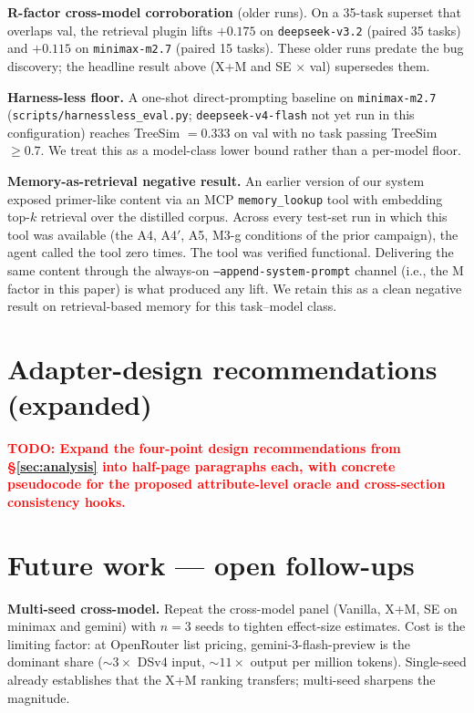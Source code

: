 \documentclass{article}
\newcommand{\todo}[1]{\textcolor{red}{\textbf{TODO: #1}}}
\begin{document}
\textbf{R-factor cross-model corroboration} (older runs). On a 35-task superset that overlaps val, the retrieval plugin lifts $+0.175$ on \texttt{deepseek-v3.2} (paired 35 tasks) and $+0.115$ on \texttt{minimax-m2.7} (paired 15 tasks). These older runs predate the bug discovery; the headline result above (X+M and SE × val) supersedes them.

\textbf{Harness-less floor.} A one-shot direct-prompting baseline on \texttt{minimax-m2.7} (\texttt{scripts/harnessless\_eval.py}; \texttt{deepseek-v4-flash} not yet run in this configuration) reaches TreeSim $= 0.333$ on val with no task passing TreeSim $\geq 0.7$. We treat this as a model-class lower bound rather than a per-model floor.

\textbf{Memory-as-retrieval negative result.} An earlier version of our system exposed primer-like content via an MCP \texttt{memory\_lookup} tool with embedding top-$k$ retrieval over the distilled corpus. Across every test-set run in which this tool was available (the A4, A4$'$, A5, M3-g conditions of the prior campaign), the agent called the tool zero times. The tool was verified functional. Delivering the same content through the always-on \texttt{--append-system-prompt} channel (i.e., the M factor in this paper) is what produced any lift. We retain this as a clean negative result on retrieval-based memory for this task--model class.

\section{Adapter-design recommendations (expanded)}
\label{app:design-recs}

\todo{Expand the four-point design recommendations from \S\ref{sec:analysis} into half-page paragraphs each, with concrete pseudocode for the proposed attribute-level oracle and cross-section consistency hooks.}

\section{Future work — open follow-ups}
\label{app:future-work}

\textbf{Multi-seed cross-model.} Repeat the cross-model panel (Vanilla, X+M, SE on minimax and gemini) with $n=3$ seeds to tighten effect-size estimates. Cost is the limiting factor: at OpenRouter list pricing, gemini-3-flash-preview is the dominant share (${\sim}3\times$ DSv4 input, ${\sim}11\times$ output per million tokens). Single-seed already establishes that the X+M ranking transfers; multi-seed sharpens the magnitude.
\end{document}
